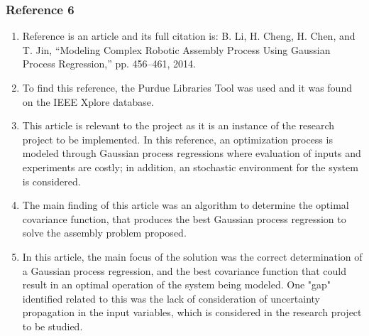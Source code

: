 \documentclass{journal}
\begin{document}
\subsubsection{Reference 6} 
\begin{enumerate}
	\item Reference \cite{Li2014} is an article and its full citation is: B. Li, H. Cheng, H. Chen, and T. Jin, “Modeling Complex Robotic Assembly Process Using Gaussian Process Regression,” pp. 456–461, 2014.
	\item To find this reference, the Purdue Libraries Tool was used and it was found on the IEEE Xplore database.
	\item This article is relevant to the project as it is an instance of the research project to be implemented. In this reference, an optimization process is modeled through Gaussian process regressions where evaluation of inputs and experiments are costly; in addition, an stochastic environment for the system is considered.
	\item The main finding of this article was an algorithm to determine the optimal covariance function, that produces the best Gaussian process regression to solve the assembly problem proposed.  
	\item In this article, the main focus of the solution was the correct determination of a Gaussian process regression, and the best covariance function that could result in an optimal operation of the system being modeled. One "gap" identified related to this was the lack of consideration of uncertainty propagation in the input variables, which is considered in the research project to be studied.
\end{enumerate}
\end{document}
